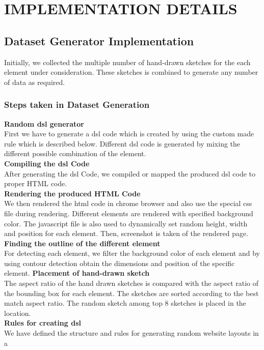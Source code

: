 \documentclass{ioereport}
\begin{document}
    \pagebreak

\section{\MakeUppercase{Implementation Details}}
\subsection{Dataset Generator Implementation}
Initially, we collected the multiple number of hand-drawn sketches for the each element
under consideration. These sketches is combined to generate any number of data as
required.
\subsubsection{Steps taken in Dataset Generation}
\textbf{Random \gls{dsl} generator}\\
First we have to generate a \gls{dsl} code which is created by using the custom made rule
which is described below. Different \gls{dsl} code is generated by mixing the different
possible combination of the element.\\
\textbf{Compiling the \gls{dsl} Code}\\
After generating the \gls{dsl} Code, we compiled or mapped the produced \gls{dsl} code to
proper HTML code.\\
\textbf{Rendering the produced HTML Code}\\
We then rendered the \gls{html} code in chrome browser and also use the special \gls{css} file
during rendering. Different elements are rendered with specified background color. The
javascript file is also used to dynamically set random height, width and position for
each element. Then, screenshot is taken of the rendered page.\\
\textbf{Finding the outline of the different element}\\
For detecting each element, we filter the background color of each element and by using
contour detection obtain the dimensions and position of the specific element.
\textbf{Placement of hand-drawn sketch}\\
The aspect ratio of the hand drawn sketches is compared with the aspect ratio of the
bounding box for each element. The sketches are sorted according to the best match
aspect ratio. The random sketch among top 8 sketches is placed in the location. \\
\textbf{Rules for creating \gls{dsl}}\\
We have defined the structure and rules for generating random website layouts in a
\end{document}

